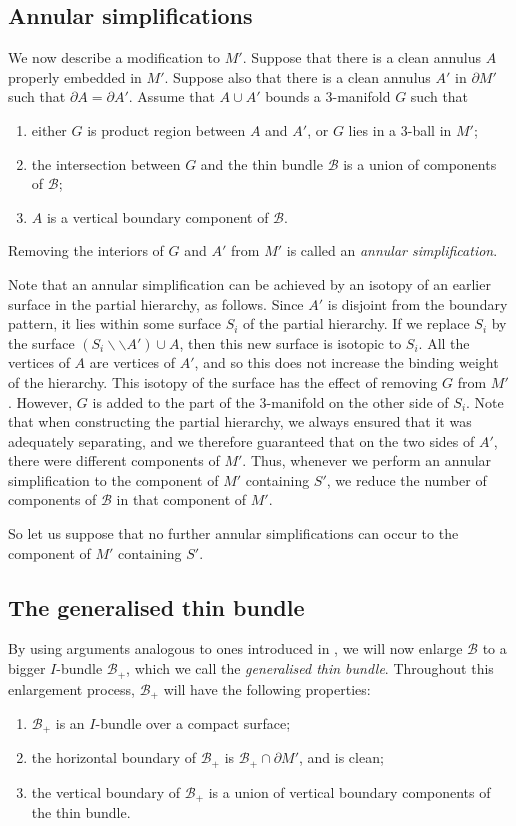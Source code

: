 \documentclass[oneside]{amsart}
\numberwithin{equation}{section}
\theoremstyle{plain}
\theoremstyle{definition}
\newcommand{\cut}{\backslash\backslash}
\newcommand{\calB}{\mathcal{B}}
\begin{document}
\subsection{Annular simplifications}
\label{Subsec:AnnularSimps}
We now describe a modification to $M'$.
Suppose that there is a clean annulus $A$ properly embedded in
$M'$. Suppose also that there is a clean annulus $A'$ in $\partial M'$ such that $\partial A = \partial A'$. Assume
that $A \cup A'$ bounds a 3-manifold $G$ such that
\begin{enumerate}
\item either $G$ is product region between $A$ and $A'$, or $G$ lies in a 3-ball in $M'$;
\item the intersection between $G$ and the thin bundle $\calB$ is a union of components of $\calB$;
\item $A$ is a vertical boundary component of $\calB$.
\end{enumerate}
Removing the interiors of $G$ and $A'$ from $M'$ is called an \emph{annular simplification}.

Note that an annular simplification can be achieved by an isotopy of an earlier surface in the partial hierarchy, as follows.
Since $A'$ is disjoint from the boundary pattern, it lies within some surface $S_i$ of the partial hierarchy.
If we replace $S_i$ by the surface $(S_i \cut A') \cup A$, then this new surface is isotopic to $S_i$.
All the vertices of $A$ are vertices of $A'$, and so this does
not increase the binding weight of the hierarchy. This isotopy of the surface has the effect of removing
$G$ from $M'$. However, $G$ is added to the part of the 3-manifold on the other side of $S_i$. Note
that when constructing the partial hierarchy, we always ensured that it was
adequately separating, and we therefore guaranteed that on the two sides of
$A'$, there were different components of $M'$. Thus, whenever we perform an annular
simplification to the component of $M'$ containing $S'$, we reduce the number of
components of $\calB$ in that component of $M'$. 

So let us suppose that no further annular simplifications can occur to the component of $M'$ containing $S'$.

\subsection{The generalised thin bundle}
\label{Subsec:GeneralisedThin}

By using arguments analogous to ones introduced in \cite{Lackenby:Composite}, we will now 
enlarge $\calB$ to a bigger $I$-bundle $\calB_+$, which we call the \emph{generalised thin bundle}.
Throughout this enlargement process, $\calB_+$ will have the following properties:
\begin{enumerate}
\item $\calB_+$ is an $I$-bundle over a compact surface;
\item the horizontal boundary of $\calB_+$ is $\calB_+ \cap \partial M'$, and is clean;
\item the vertical boundary of $\calB_+$ is a union of vertical boundary components of the thin bundle.
\end{enumerate}
\end{document}
